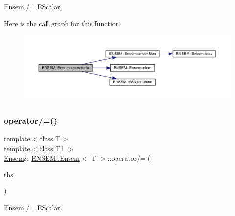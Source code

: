 \mbox{\hyperlink{classENSEM_1_1Ensem}{Ensem}} /= \mbox{\hyperlink{classENSEM_1_1EScalar}{E\+Scalar}}. 

Here is the call graph for this function\+:
\nopagebreak
\begin{figure}[H]
\begin{center}
\leavevmode
\includegraphics[width=350pt]{d7/d3e/classENSEM_1_1Ensem_a32bf70c0844ce98695151457bf9df018_cgraph}
\end{center}
\end{figure}
\mbox{\label{classENSEM_1_1Ensem_a32bf70c0844ce98695151457bf9df018}} 
\subsubsection{\texorpdfstring{operator/=()}{operator/=()}\hspace{0.1cm}{\footnotesize\ttfamily [3/6]}}
{\footnotesize\ttfamily template$<$class T$>$ \\
template$<$class T1 $>$ \\
\mbox{\hyperlink{classENSEM_1_1Ensem}{Ensem}}\& \mbox{\hyperlink{classENSEM_1_1Ensem}{E\+N\+S\+E\+M\+::\+Ensem}}$<$ T $>$\+::operator/= (\begin{DoxyParamCaption}\item[{const \mbox{\hyperlink{classENSEM_1_1EScalar}{E\+Scalar}}$<$ T1 $>$ \&}]{rhs }\end{DoxyParamCaption})\hspace{0.3cm}{\ttfamily [inline]}}



\mbox{\hyperlink{classENSEM_1_1Ensem}{Ensem}} /= \mbox{\hyperlink{classENSEM_1_1EScalar}{E\+Scalar}}. 

